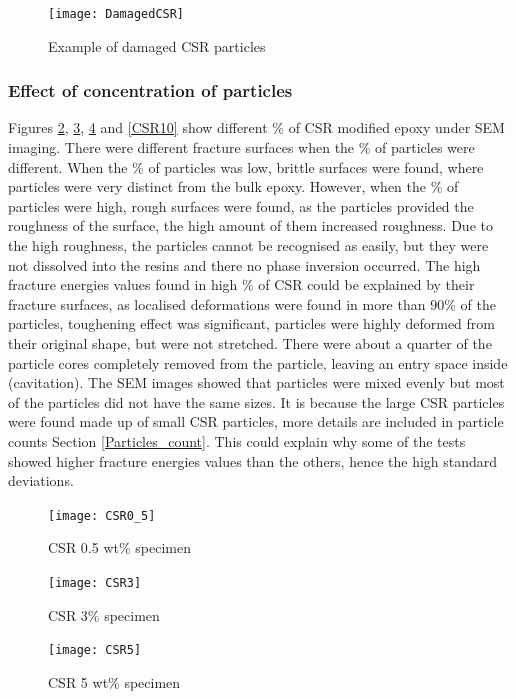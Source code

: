 \documentclass[numbers=noendperiod,chapterprefix=on]{icldt} %
\begin{document}
{\begin{figure}[!htpb]
\centering
\texttt{[image: DamagedCSR]}
\caption{Example of damaged CSR particles} \label{DamagedCSR}
\end{figure}
\FloatBarrier

\subsubsection{Effect of concentration of particles}
Figures \ref{CSR0_5}, \ref{CSR3}, \ref{CSR5} and \ref{CSR10} show different \% of CSR modified epoxy under SEM imaging. There were different fracture surfaces when the \% of particles were different. When the \% of particles was low, brittle surfaces were found, where particles were very distinct from the bulk epoxy. However, when the \% of particles were high, rough surfaces were found, as the particles provided the roughness of the surface, the high amount of them increased roughness. Due to the high roughness, the particles cannot be recognised as easily, but they were not dissolved into the resins and there no phase inversion occurred. The high fracture energies values found in high \% of CSR could be explained by their fracture surfaces, as localised deformations were found in more than 90\% of the particles, toughening effect was significant, particles were highly deformed from their original shape, but were not stretched. There were about a quarter of the particle cores completely removed from the particle, leaving an entry space inside (cavitation). The SEM images showed that particles were mixed evenly but most of the particles did not have the same sizes.
It is because the large CSR particles were found made up of small CSR particles, more details are included in particle counts Section \ref{Particles_count}. 
This could explain why some of the tests showed higher fracture energies values than the others, hence the high standard deviations. 

\begin{figure}[!hp]
\centering
\texttt{[image: CSR0\_5]}
\caption{CSR 0.5 wt\% specimen}\label{CSR0_5}
\end{figure}
\FloatBarrier

\begin{figure}[!htpb]
\centering
\texttt{[image: CSR3]}
\caption{CSR 3\% specimen}\label{CSR3}
\end{figure}
\FloatBarrier

\begin{figure}[!htpb]
\centering
\texttt{[image: CSR5]} 
\caption{CSR 5 wt\% specimen}\label{CSR5}
\end{figure}
\FloatBarrier

}
\end{document}
